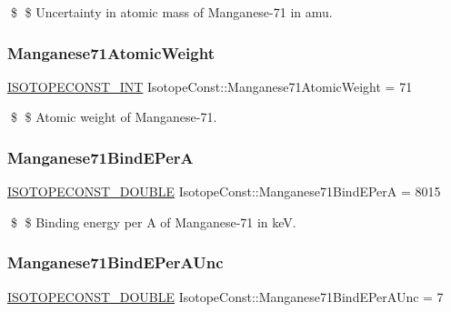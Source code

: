 \$ \$ Uncertainty in atomic mass of Manganese-\/71 in amu. \mbox{\label{group___isotope_const-_manganese-_mn71_ga4c6684dfadb1c6973ca895076769e23a}} 
\subsubsection{\texorpdfstring{Manganese71\+Atomic\+Weight}{Manganese71AtomicWeight}}
{\footnotesize\ttfamily \mbox{\hyperlink{group___isotope_const-_macros_ga5f18360b3e99483a35c32d789e62621c}{I\+S\+O\+T\+O\+P\+E\+C\+O\+N\+S\+T\+\_\+\+I\+NT}} Isotope\+Const\+::\+Manganese71\+Atomic\+Weight = 71}

\$ \$ Atomic weight of Manganese-\/71. \mbox{\label{group___isotope_const-_manganese-_mn71_ga31b934f0f1fb351501760d1a202b42ac}} 
\subsubsection{\texorpdfstring{Manganese71\+Bind\+E\+PerA}{Manganese71BindEPerA}}
{\footnotesize\ttfamily \mbox{\hyperlink{group___isotope_const-_macros_ga8f45a7272ce02c0b4c65c44636ed719a}{I\+S\+O\+T\+O\+P\+E\+C\+O\+N\+S\+T\+\_\+\+D\+O\+U\+B\+LE}} Isotope\+Const\+::\+Manganese71\+Bind\+E\+PerA = 8015}

\$ \$ Binding energy per A of Manganese-\/71 in keV. \mbox{\label{group___isotope_const-_manganese-_mn71_ga3fc31cb90e2da6772799e191682fd146}} 
\subsubsection{\texorpdfstring{Manganese71\+Bind\+E\+Per\+A\+Unc}{Manganese71BindEPerAUnc}}
{\footnotesize\ttfamily \mbox{\hyperlink{group___isotope_const-_macros_ga8f45a7272ce02c0b4c65c44636ed719a}{I\+S\+O\+T\+O\+P\+E\+C\+O\+N\+S\+T\+\_\+\+D\+O\+U\+B\+LE}} Isotope\+Const\+::\+Manganese71\+Bind\+E\+Per\+A\+Unc = 7}

